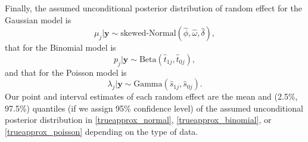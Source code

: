 \documentclass[article]{jss}
\begin{document}
Finally, the assumed unconditional posterior distribution of random effect for the Gaussian model is
\begin{equation}\label{trueapprox_normal}
\mu_j\vert \boldsymbol{y} \sim \textrm{skewed-Normal}(\hat{\phi}, \hat{\omega}, \hat{\delta}),
\end{equation}
that for the Binomial model is
\begin{equation}\label{trueapprox_binomial}
p_j\vert \boldsymbol{y} \sim \textrm{Beta}(\hat{t}_{1j}, \hat{t}_{0j}),
\end{equation}
and that for the Poisson model is
\begin{equation}\label{trueapprox_poisson}
\lambda_j\vert \boldsymbol{y} \sim \textrm{Gamma}(\hat{s}_{1j}, \hat{s}_{0j}).
\end{equation}
Our point and interval estimates of each random effect are the  mean and (2.5\%, 97.5\%) quantiles (if we assign 95\% confidence level) of the assumed unconditional posterior distribution in  \eqref{trueapprox_normal}, \eqref{trueapprox_binomial}, or \eqref{trueapprox_poisson} depending on the type of data.









\end{document}
